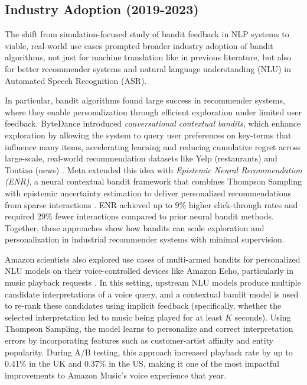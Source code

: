\documentclass[11pt]{article}
\begin{document}
\subsection{Industry Adoption (2019-2023)}

The shift from simulation-focused study of bandit feedback in NLP systems to viable, real-world use cases prompted broader industry adoption of bandit algorithms, not just for machine translation like in previous literature, but also for better recommender systems and natural language understanding (NLU) in Automated Speech Recognition (ASR).

In particular, bandit algorithms found large success in recommender systems, where they enable personalization through efficient exploration under limited user feedback. ByteDance introduced \textit{conversational contextual bandits}, which enhance exploration by allowing the system to query user preferences on key-terms that influence many items, accelerating learning and reducing cumulative regret across large-scale, real-world recommendation datasets like Yelp (restaurants) and Toutiao (news) \cite{zhang-bytedance-2019}. Meta extended this idea with \textit{Epistemic Neural Recommendation (ENR)}, a neural contextual bandit framework that combines Thompson Sampling with epistemic uncertainty estimation to deliver personalized recommendations from sparse interactions \cite{meta-recommender-bandits}. ENR achieved up to 9\% higher click-through rates and required 29\% fewer interactions compared to prior neural bandit methods. Together, these approaches show how bandits can scale exploration and personalization in industrial recommender systems with minimal supervision.

Amazon scientists also explored use cases of multi-armed bandits for personalized NLU models on their voice-controlled devices like Amazon Echo, particularly in music playback requests \cite{Amazon-Moerchen2020}. In this setting, upstream NLU models produce multiple candidate interpretations of a voice query, and a contextual bandit model is used to re-rank these candidates using implicit feedback (specifically, whether the selected interpretation led to music being played for at least $K$ seconds). Using Thompson Sampling, the model learns to personalize and correct interpretation errors by incorporating features such as customer-artist affinity and entity popularity. During A/B testing, this approach increased playback rate by up to 0.41\% in the UK and 0.37\% in the US, making it one of the most impactful improvements to Amazon Music’s voice experience that year.
\end{document}
